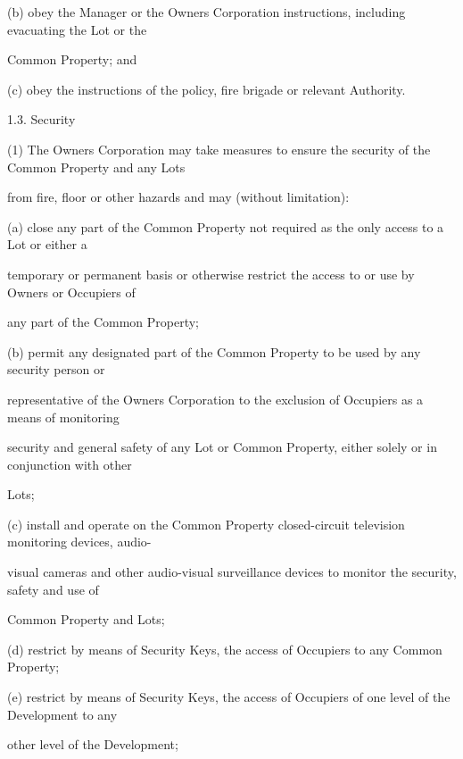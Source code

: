 \documentclass{article}
\begin{document}
{\fontsize{9.962}{1}(b) obey the Manager or the Owners Corporation instructions, including evacuating the Lot or the }

{\fontsize{10.02}{1}Common Property; and }

{\fontsize{9.962}{1}(c) obey the instructions of the policy, fire brigade or relevant Authority. }

{\fontsize{9.99}{1}1.3. Security }

{\fontsize{9.962}{1}(1) The Owners Corporation may take measures to ensure the security of the Common Property and any Lots }

{\fontsize{10.02}{1}from fire, floor or other hazards and may (without limitation): }

{\fontsize{9.962}{1}(a) close any part of the Common Property not required as the only access to a Lot or either a }

{\fontsize{10.02}{1}temporary or permanent basis or otherwise restrict the access to or use by Owners or Occupiers of }

{\fontsize{10.02}{1}any part of the Common Property; }

{\fontsize{9.962}{1}(b) permit any designated part of the Common Property to be used by any security person or }

{\fontsize{10.02}{1}representative of the Owners Corporation to the exclusion of Occupiers as a means of monitoring }

{\fontsize{10.02}{1}security and general safety of any Lot or Common Property, either solely or in conjunction with other }

{\fontsize{10.02}{1}Lots; }

{\fontsize{9.962}{1}(c) install and operate on the Common Property closed-circuit television monitoring devices, audio- }

{\fontsize{10.02}{1}visual cameras and other audio-visual surveillance devices to monitor the security, safety and use of }

{\fontsize{10.02}{1}Common Property and Lots; }

{\fontsize{9.962}{1}(d) restrict by means of Security Keys, the access of Occupiers to any Common Property; }

{\fontsize{9.962}{1}(e) restrict by means of Security Keys, the access of Occupiers of one level of the Development to any }

{\fontsize{10.02}{1}other level of the Development; }

\newpage
\end{document}
